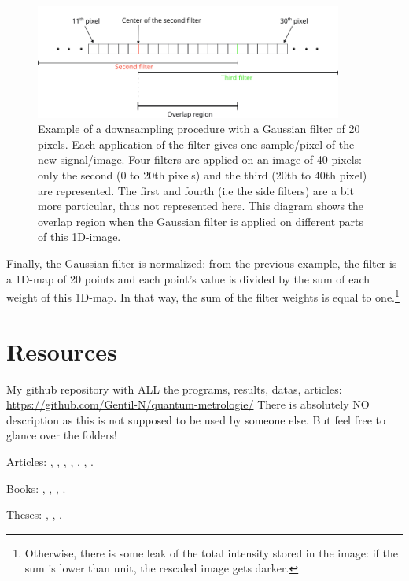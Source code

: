 \documentclass[11pt]{report}
\begin{document}
\begin{figure}[h!]
\centering
\includegraphics[width=0.9\textwidth]{dwsmpl-filter}
\caption{Example of a downsampling procedure with a Gaussian filter of 20 pixels. Each application of the filter gives one sample/pixel of the new signal/image. Four filters are applied on an image of 40 pixels: only the second (0 to 20th pixels) and the third (20th to 40th pixel) are represented. The first and fourth (i.e the side filters) are a bit more particular, thus not represented here. This diagram shows the overlap region when the Gaussian filter is applied on different parts of this 1D-image.}
\label{fig:dwsmpl-filter}
\end{figure}

Finally, the Gaussian filter is normalized: from the previous example, the filter is a 1D-map of 20 points and each point's value is divided by the sum of each weight of this 1D-map. In that way, the sum of the filter weights is equal to one.\footnote{Otherwise, there is some leak of the total intensity stored in the image: if the sum is lower than unit, the rescaled image gets darker.}

\chapter{Resources}

My github repository with ALL the programs, results, datas, articles: \href{https://github.com/Gentil-N/quantum-metrologie/}{https://github.com/Gentil-N/quantum-metrologie/}
There is absolutely NO description as this is not supposed to be used by someone else. But feel free to glance over the folders!

Articles: \cite{dicke}, \cite{introlindblad}, \cite{cumujulia}, \cite{jcumlarson}, \cite{exprepcumu}, \cite{exprepcumuryogo}, \cite{lindmatrix}.

Books: \cite{mandelwolf}, \cite{paulwinfield}, \cite{foxmark}, \cite{rloudon}.

Theses: \cite{sofus}, \cite{mikkel}, \cite{stefan}.

\printbibliography
\end{document}
